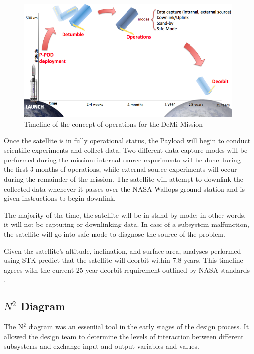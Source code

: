 \documentclass[12pt]{article}
\begin{document}
		\begin{figure}[!ht]
				\centering
				\includegraphics[width=5in]{images/MissionOverview_1.png}
				\caption{Timeline of the concept of operations for the DeMi Mission}
				\label{fig:Mission_ConOps}
			\end{figure}

		Once the satellite is in fully operational status, the Payload will begin to conduct scientific experiments and collect data. Two different data capture modes will be performed during the mission: internal source experiments will be done during the first 3 months of operations, while external source experiments will occur during the remainder of the mission. The satellite will attempt to downlink the collected data whenever it passes over the NASA Wallops ground station and is given instructions to begin downlink.  

The majority of the time, the satellite will be in stand-by mode; in other words, it will not be capturing or downlinking data. In case of a subsystem malfunction, the satellite will go into safe mode to diagnose the source of the problem. 

Given the satellite's altitude, inclination, and surface area, analyses performed using STK predict that the satellite will deorbit within 7.8 years. This timeline agrees with the current 25-year deorbit requirement outlined by NASA standards \cite{nasa-deorbit}.


\subsection{$N^2$ Diagram}

		The N$^2$ diagram was an essential tool in the early stages of the design process. It allowed the design team to determine the levels of interaction between different subsystems and exchange input and output variables and values. 
\end{document}
